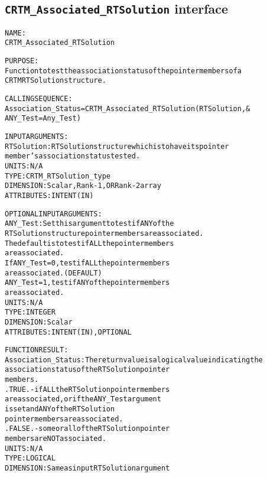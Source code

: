 \subsection{\texttt{CRTM\_Associated\_RTSolution} interface}
  \label{sec:CRTM_Associated_RTSolution_interface}
  \begin{alltt}
 
  NAME:
        CRTM_Associated_RTSolution
 
  PURPOSE:
        Function to test the association status of the pointer members of a
        CRTM RTSolution structure.
 
  CALLING SEQUENCE:
        Association_Status = CRTM_Associated_RTSolution( RTSolution       , &
                                                         ANY_Test=Any_Test  )
 
  INPUT ARGUMENTS:
        RTSolution:          RTSolution structure which is to have its pointer
                             member's association status tested.
                             UNITS:      N/A
                             TYPE:       CRTM_RTSolution_type
                             DIMENSION:  Scalar, Rank-1, OR Rank-2 array
                             ATTRIBUTES: INTENT(IN)
 
 
  OPTIONAL INPUT ARGUMENTS:
        ANY_Test:            Set this argument to test if ANY of the
                             RTSolution structure pointer members are associated.
                             The default is to test if ALL the pointer members
                             are associated.
                             If ANY_Test = 0, test if ALL the pointer members
                                              are associated.  (DEFAULT)
                                ANY_Test = 1, test if ANY of the pointer members
                                              are associated.
                             UNITS:      N/A
                             TYPE:       INTEGER
                             DIMENSION:  Scalar
                             ATTRIBUTES: INTENT(IN), OPTIONAL
 
  FUNCTION RESULT:
        Association_Status:  The return value is a logical value indicating the
                             association status of the RTSolution pointer
                             members.
                             .TRUE.  - if ALL the RTSolution pointer members
                                       are associated, or if the ANY_Test argument
                                       is set and ANY of the RTSolution
                                       pointer members are associated.
                             .FALSE. - some or all of the RTSolution pointer
                                       members are NOT associated.
                             UNITS:      N/A
                             TYPE:       LOGICAL
                             DIMENSION:  Same as input RTSolution argument
 
  \end{alltt}
